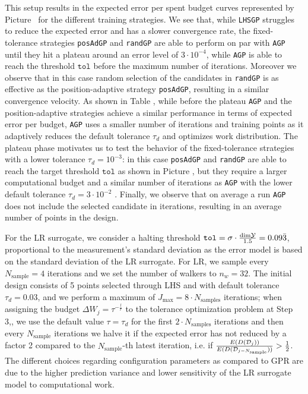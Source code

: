 This setup results in the expected error per spent budget curves represented by Picture~ for the different training strategies.
We see that, while \texttt{LHSGP} struggles to reduce the expected error and has a slower convergence rate, the fixed-tolerance strategies \texttt{posAdGP} and \texttt{randGP} are able to perform on par with \texttt{AGP} until they hit a plateau around an error level of $3\cdot 10^{-4}$, while \texttt{AGP} is able to reach the threshold $\texttt{tol}$ before the maximum number of iterations.
Moreover we observe that in this case random selection of the candidates in \texttt{randGP} is as effective as the position-adaptive strategy \texttt{posAdGP}, resulting in a similar convergence velocity.
As shown in Table , while before the plateau \texttt{AGP} and the position-adaptive strategies achieve a similar performance in terms of expected error per budget, \texttt{AGP} uses a smaller number of iterations and training points as it adaptively reduces the default tolerance $\tau_d$ and optimizes work distribution.
The plateau phase motivates us to test the behavior of the fixed-tolerance strategies with a lower tolerance $\tau_d = 10^{-3}$: in this case \texttt{posAdGP} and \texttt{randGP} are able to reach the target threshold $\texttt{tol}$ as shown in Picture , but they require a larger computational budget and a similar number of iterations as \texttt{AGP} with the lower default tolerance $\tau_d =  3\cdot 10^{-2}$ .
Finally, we observe that on average a run \texttt{AGP} does not include the selected candidate in  iterations, resulting in an average number of points in the design.\medskip

For the LR surrogate, we consider a halting threshold $\texttt{tol} = \sigma \cdot \frac{\text{dim} \mathcal Y }{1.5} = 0.09\bar 3$, proportional to the measurement's standard deviation as the error model is based on the standard deviation of the LR surrogate.
For LR, we sample every $N_{\text{sample}} = 4$ iterations and we set the number of walkers to $n_w = 32$.
The initial design consists of 5 points selected through LHS and with default tolerance $\tau_d = 0.03$, and we perform a maximum of $J_{\max} = 8 \cdot N_{\text{samples}}$ iterations; when assigning the budget $\Delta W_j = \tau ^{-\frac{l}{r}}$ to the tolerance optimization problem at Step 3,, we use the default value $\tau= \tau_d$ for the first $2\cdot N_{\text{samples}}$ iterations and then every $N_{\text{sample}}$ iterations we halve it if the expected error has not reduced by a factor 2 compared to the $N_{\text{sample}}$-th latest iteration, i.e. if $\frac{E(D(\mathcal D_j))}{E(D(\mathcal D_{j-N_{\text{sample}}}))} > \frac{1}{2}$.
The different choices regarding configuration parameters as compared to GPR are due to the higher prediction variance and lower sensitivity of the LR surrogate model to computational work. 

